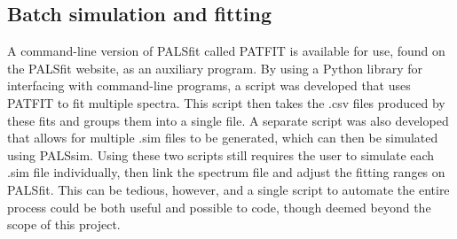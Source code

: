 \subsection{Batch simulation and fitting}
A command-line version of PALSfit called PATFIT is available for use, found on the PALSfit website, as an auxiliary program. By using a Python library for interfacing with command-line programs, a script was developed that uses PATFIT to fit multiple spectra. This script then takes the .csv files produced by these fits and groups them into a single file. A separate script was also developed that allows for multiple .sim files to be generated, which can then be simulated using PALSsim.
Using these two scripts still requires the user to simulate each .sim file individually, then link the spectrum file and adjust the fitting ranges on PALSfit. This can be tedious, however, and a single script to automate the entire process could be both useful and possible to code, though deemed beyond the scope of this project.